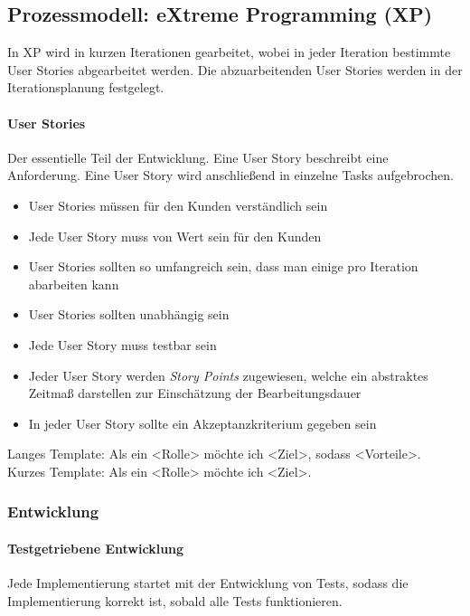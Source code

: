 \documentclass[
    ngerman,
    color=3b,
    summary,
    boxarc,
    main,
]{rubos-tuda-template}
\begin{document}
\subsection{Prozessmodell: eXtreme Programming (XP)}
In XP wird in kurzen Iterationen gearbeitet, wobei in jeder Iteration bestimmte User Stories abgearbeitet werden. Die abzuarbeitenden User Stories werden in der Iterationsplanung festgelegt.

\paragraph{User Stories}\mbox{}\par
\begin{definition}
    Der essentielle Teil der Entwicklung. Eine User Story beschreibt eine Anforderung. Eine User Story wird anschließend in einzelne Tasks aufgebrochen.
\end{definition}

\begin{itemize}
    \item User Stories müssen für den Kunden verständlich sein
    \item Jede User Story muss von Wert sein für den Kunden
    \item User Stories sollten so umfangreich sein, dass man einige pro Iteration abarbeiten kann
    \item User Stories sollten unabhängig sein
    \item Jede User Story muss testbar sein
    \item Jeder User Story werden \textit{Story Points} zugewiesen, welche ein abstraktes Zeitmaß darstellen zur Einschätzung der Bearbeitungsdauer
    \item In jeder User Story sollte ein Akzeptanzkriterium gegeben sein
\end{itemize}

\noindent Langes Template: Als ein <Rolle> möchte ich <Ziel>, sodass <Vorteile>. \\
Kurzes Template: Als ein <Rolle> möchte ich <Ziel>.
\clearpage
\subsubsection{Entwicklung}
\paragraph{Testgetriebene Entwicklung}
Jede Implementierung startet mit der Entwicklung von Tests, sodass die Implementierung korrekt ist, sobald alle Tests funktionieren.
\end{document}
